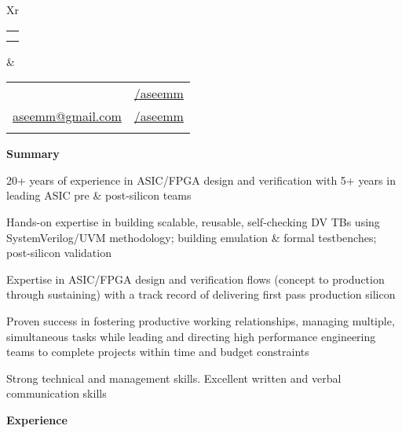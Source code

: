 \documentclass[letterpaper,12pt]{article}[leftmargin=*]
\makeatletter
\def \fullname {Aseem Maheshwari}
\def \subtitle {}
\def \linkedinicon {\faLinkedin}
\def \linkedinlink {https://linkedin.com/in/aseemm/}
\def \linkedintext {/aseemm}
\def \phoneicon {\faPhone}
\def \phonetext {+1-510-516-1655}
\def \emailicon {\faEnvelope}
\def \emaillink {mailto:aseemm@gmail.com}
\def \emailtext {aseemm@gmail.com}
\def \githubicon {\faGithub}
\def \githublink {https://github.com/aseemm}
\def \githubtext {/aseemm}
\def \headertype {\doublecol} %
\def \entryspacing {-0pt}
\def \linkedin {\linkedinicon \hspace{3pt}\href{\linkedinlink}{\linkedintext}}
\def \phone {\phoneicon \hspace{3pt}{ \phonetext}}
\def \email {\emailicon \hspace{3pt}\href{\emaillink}{\emailtext}}
\def \github {\githubicon \hspace{3pt}\href{\githublink}{\githubtext}}
\renewcommand{\section}[2]{\vspace{5pt}
  \colorbox{secondary}{\color{white}\raggedbottom\normalsize\textbf{{#1}{\hspace{7pt}#2}}}
}
\newcommand{\resumeEntryStart}{\begin{itemize}[leftmargin=2.5mm]}
\newcommand{\resumeEntryEnd}{\end{itemize}\vspace{\entryspacing}}
\newcommand{\resumeItemListStart}{\begin{itemize}[leftmargin=4.5mm]}
\newcommand{\resumeItemListEnd}{\end{itemize}}
\newcommand{\resumeItem}[1]{
\item\small{
  {#1 \vspace{-2pt}}
}
}
\newcommand{\resumeEntrySummary}{
  \vspace{-1pt}\item[]
}
\newcommand{\doublecol}[6]{
  \begin{tabularx}{\textwidth}{Xr}
    {
      \begin{tabular}[c]{l}
        \fontsize{25}{35}\selectfont{\color{primary}{{\textbf{\fullname}}}} \\
                 {\textit{\subtitle}} %
      \end{tabular}
    } & {
      \begin{tabular}[c]{l@{\hspace{1.5em}}l}
        {\small#4} & {\small#1} \\
        {\small#5} & {\small#2} \\
        {\small#6} & {\small#3}
      \end{tabular}
    }
  \end{tabularx}
}
\newcommand{\singlecol}[6]{
  \begin{tabularx}{\textwidth}{Xr}
    {
      \begin{tabular}[b]{l}
        \fontsize{25}{35}\selectfont{\color{primary}{{\textbf{\fullname}}}} \\
                 {\textit{\subtitle}} %
      \end{tabular}
    } & {
      \begin{tabular}[c]{l}
        {\small#1} \\
        {\small#2} \\
        {\small#3} \\
        {\small#4} \\
        {\small#5} \\
        {\small#6}
      \end{tabular}
    }
  \end{tabularx}
}
\makeatother
\begin{document}



\headertype{\linkedin}{\github}{}{\phone}{\email}{} %
\vspace{-10pt} %

\section{\faBook}{Summary}

\resumeEntryStart
\resumeEntrySummary
    \resumeItemListStart
    \resumeItem {20+ years of experience in ASIC/FPGA design and verification with 5+ years in leading ASIC pre \& post-silicon teams}
 {}{    
    \resumeItem {Hands-on expertise in building scalable, reusable, self-checking DV TBs using SystemVerilog/UVM methodology; building emulation \& formal testbenches; post-silicon validation}
}
 {
    \resumeItem {Expertise in ASIC/FPGA design and verification flows (concept to production through sustaining) with a track record of delivering first pass production silicon}
}{}
    \resumeItem {Proven success in fostering productive working relationships, managing multiple, simultaneous tasks while leading and directing high performance engineering teams to complete projects within time and budget constraints}
    \resumeItem {Strong technical and management skills. Excellent written and verbal communication skills}
    \resumeItemListEnd
\resumeEntryEnd
    
\section{\faPieChart}{Experience}
\end{document}
